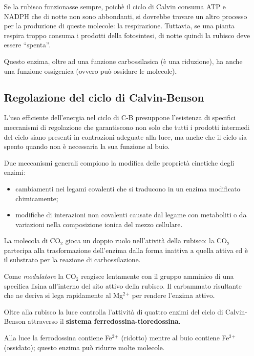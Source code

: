 \documentclass[]{article}
\begin{document}
Se la rubisco funzionasse sempre, poichè il ciclo di Calvin consuma ATP
e NADPH che di notte non sono abbondanti, si dovrebbe trovare un altro
processo per la produzione di queste molecole: la respirazione.
Tuttavia, se una pianta respira troppo consuma i prodotti della
fotosintesi, di notte quindi la rubisco deve essere ``spenta''.

Questo enzima, oltre ad una funzione carbossilasica (è una riduzione),
ha anche una funzione ossigenica (ovvero può ossidare le molecole).

\subsection{Regolazione del ciclo di
Calvin-Benson}\label{regolazione-del-ciclo-di-calvin-benson}

L'uso efficiente dell'energia nel ciclo di C-B presuppone l'esistenza di
specifici meccanismi di regolazione che garantiscono non solo che tutti
i prodotti intermedi del ciclo siano presenti in contrazioni adeguate
alla luce, ma anche che il ciclo sia spento quando non è necessaria la
sua funzione al buio.

Due meccanismi generali compiono la modifica delle proprietà cinetiche
degli enzimi:

\begin{itemize}
\itemsep1pt\parskip0pt
\item
  cambiamenti nei legami covalenti che si traducono in un enzima
  modificato chimicamente;
\item
  modifiche di interazioni non covalenti causate dal legame con
  metaboliti o da variazioni nella composizione ionica del mezzo
  cellulare.
\end{itemize}

La molecola di CO$_2$ gioca un doppio ruolo nell'atività della rubisco:
la CO$_2$ partecipa alla trasformazione dell'enzima dalla forma inattiva
a quella attiva ed è il substrato per la reazione di carbossilazione.

Come \emph{modulatore} la CO$_2$ reagisce lentamente con il gruppo
amminico di una specifica lisina all'interno del sito attivo della
rubisco. Il carbammato risultante che ne deriva si lega rapidamente al
Mg$^2$$^+$ per rendere l'enzima attivo.

Oltre alla rubisco la luce controlla l'attività di quattro enzimi del
ciclo di Calvin-Benson attraverso il \textbf{sistema
ferredossina-tioredossina}.

Alla luce la ferrodossina contiene Fe$^2$$^+$ (ridotto) mentre al buio
contiene Fe$^3$$^+$ (ossidato); questo enzima può ridurre molte
molecole.
\end{document}
